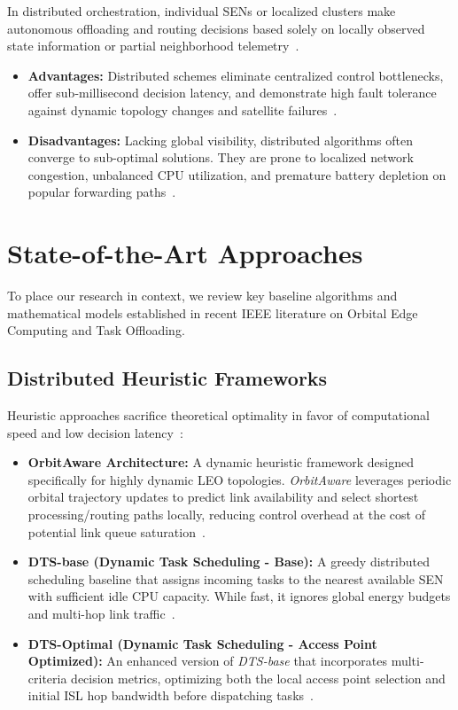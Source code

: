 In distributed orchestration, individual SENs or localized clusters make autonomous offloading and routing decisions based solely on locally observed state information or partial neighborhood telemetry~\cite{batman_protocol, icdcs_satellite_2025}.

\begin{itemize}
    \item \textbf{Advantages:} Distributed schemes eliminate centralized control bottlenecks, offer sub-millisecond decision latency, and demonstrate high fault tolerance against dynamic topology changes and satellite failures~\cite{icdcs_satellite_2025}.
    \item \textbf{Disadvantages:} Lacking global visibility, distributed algorithms often converge to sub-optimal solutions. They are prone to localized network congestion, unbalanced CPU utilization, and premature battery depletion on popular forwarding paths~\cite{tang2003loadbalancing, zhong2025leo}.
\end{itemize}

\section{State-of-the-Art Approaches}
\label{sec:bg_state_of_the_art}

To place our research in context, we review key baseline algorithms and mathematical models established in recent IEEE literature on Orbital Edge Computing and Task Offloading.

\subsection{Distributed Heuristic Frameworks}

Heuristic approaches sacrifice theoretical optimality in favor of computational speed and low decision latency~\cite{icdcs_satellite_2025}:

\begin{itemize}
    \item \textbf{OrbitAware Architecture:} A dynamic heuristic framework designed specifically for highly dynamic LEO topologies. \textit{OrbitAware} leverages periodic orbital trajectory updates to predict link availability and select shortest processing/routing paths locally, reducing control overhead at the cost of potential link queue saturation~\cite{icdcs_satellite_2025}.
    \item \textbf{DTS-base (Dynamic Task Scheduling - Base):} A greedy distributed scheduling baseline that assigns incoming tasks to the nearest available SEN with sufficient idle CPU capacity. While fast, it ignores global energy budgets and multi-hop link traffic~\cite{icdcs_satellite_2025}.
    \item \textbf{DTS-Optimal (Dynamic Task Scheduling - Access Point Optimized):} An enhanced version of \textit{DTS-base} that incorporates multi-criteria decision metrics, optimizing both the local access point selection and initial ISL hop bandwidth before dispatching tasks~\cite{icdcs_satellite_2025}.
\end{itemize}

